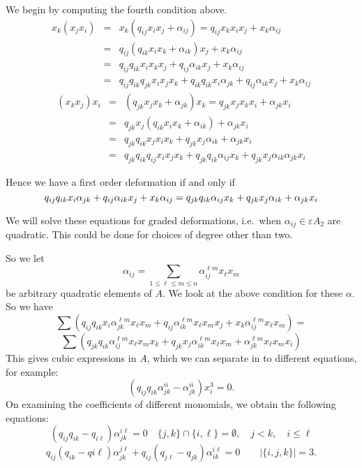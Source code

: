 \documentclass[12]{article}
\begin{document}
We begin by computing the fourth condition above.
\begin{eqnarray*}
  x_k(x_jx_i) 
& = & x_k(q_{ij} x_ix_j + \alpha_{ij}) = q_{ij} x_kx_ix_j+ x_k \alpha_{ij} \\
& = & q_{ij} (q_{ik}x_ix_k + \alpha_{ik})x_j +x_k\alpha_{ij}\\
& = & q_{ij}q_{ik}x_ix_kx_j +q_{ij}\alpha_{ik} x_j + x_k \alpha_{ij}\\
& = & q_{ij}q_{ik}q_{jk} x_ix_jx_k + q_{ik}q_{ik}x_i\alpha_{jk} + q_{ij}\alpha_{ik}x_j + x_k\alpha_{ij}
\end{eqnarray*}
\begin{eqnarray*}
(x_kx_j)x_i
& = & (q_{jk} x_jx_k + \alpha_{jk})x_k = q_{jk} x_jx_kx_i+ \alpha_{jk}x_i \\
& = & q_{jk}x_j(q_{ik}x_ix_k+\alpha_{ik}) + \alpha_{jk}x_i \\
& = & q_{jk}q_{ik}x_jx_ix_k+q_{jk}x_j\alpha_{ik}+\alpha_{jk}x_i \\
& = & q_{jk}q_{ik}q_{ij}x_ix_jx_k + q_{jk}q_{ik} \alpha_{ij} x_k +q_{jk}x_j\alpha_{ik} \alpha_{jk}x_i
\end{eqnarray*}

Hence we have a first order deformation if and only if
$$q_{ij}q_{ik}x_i\alpha_{jk}+q_{ij}\alpha_{ik}x_j+x_k\alpha_{ij} \\
= q_{jk}q_{ik} \alpha_{ij}x_k + q_{jk}x_j\alpha_{ik} +\alpha_{jk}x_i$$

We will solve these equations for graded deformations, i.e.~when $\alpha_{ij} \in \varepsilon A_2$ are quadratic.  This could be done for choices of degree other than two.

So we let
$$\alpha_{ij} = \sum_{1 \leq \ell \leq m \leq n} \alpha_{ij}^{\ell m} x_\ell x_m$$
be arbitrary quadratic elements of $A$.  We look at the above condition for these $\alpha$.
So we have 
$$ \sum(q_{ij}q_{ik}x_i\alpha_{jk}^{\ell m} x_\ell x_m+q_{ij}\alpha_{ik}^{\ell m} x_\ell x_mx_j+x_k\alpha_{ij}^{\ell m} x_\ell x_m) = $$ $$\sum( q_{jk}q_{ik} \alpha_{ij}^{\ell m} x_\ell x_mx_k + q_{jk}x_j\alpha_{ik}^{\ell m} x_\ell x_m +\alpha_{jk}^{\ell m} x_\ell x_mx_i)$$
This gives cubic expressions in $A$, which we can separate in to different equations, for example:
$$(q_{ij} q_{ik} \alpha_{jk}^{ii} -\alpha_{jk}^{ii}) x_i^3 = 0.$$
On examining the coefficients of different monomials, we obtain the following
equations:
$$ (q_{ij}q_{ik}-q_{i\ell})\alpha_{jk}^{i\ell} = 0 \quad  \{ j,k \} \cap \{i,\ell\} = \emptyset, \quad  j<k, \quad i \leq \ell$$
  $$ q_{ij}(q_{ik}-q{i\ell}) \alpha_{jk}^{j\ell} + q_{ij}(q_{j\ell}-q_{jk}) \alpha_{ik}^{i\ell} = 0 \quad \quad |\{ i,j,k \}| =3.$$
\end{document}
